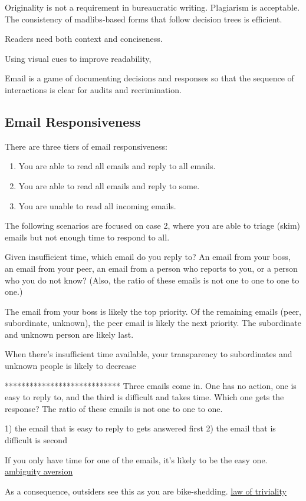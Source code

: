 Originality is not a requirement in bureaucratic writing. Plagiarism is acceptable. The consistency of madlibs-based forms that follow decision trees is efficient. 

Readers need both context and conciseness. 

Using visual cues to improve readability,

Email is a game of documenting decisions and responses so that the sequence of interactions is clear for audits and recrimination. 

\subsection*{Email Responsiveness\label{sec:email-responsiveness}}

There are three tiers of email responsiveness:
\begin{enumerate}
    \item You are able to read all emails and reply to all emails.
    \item You are able to read all emails and reply to some.
    \item You are unable to read all incoming emails. 
\end{enumerate}
The following scenarios are focused on case 2, where you are able to triage (skim) emails but not enough time to respond to all.


Given insufficient time, which email do you reply to? An email from your boss, an email from your peer, an email from a person who reports to you, or a person who you do not know?
(Also, the ratio of these emails is not one to one to one to one.)

The email from your boss is likely the top priority. Of the remaining emails (peer, subordinate, unknown), the peer email is likely the next priority.
The subordinate and unknown person are likely last.

When there's insufficient time available, your transparency to subordinates and unknown people is likely to decrease

****************************
Three emails come in. One has no action, one is easy to reply to, and the third is difficult and takes time. Which one gets the response?
The ratio of these emails is not one to one to one.

1) the email that is easy to reply to gets answered first
2) the email that is difficult is second

If you only have time for one of the emails, it's likely to be the easy one. 
\href{https://en.wikipedia.org/wiki/Ambiguity_aversion}{ambiguity aversion}

As a consequence, outsiders see this as you are bike-shedding.
\href{https://en.wikipedia.org/wiki/Law_of_triviality}{law of triviality}


